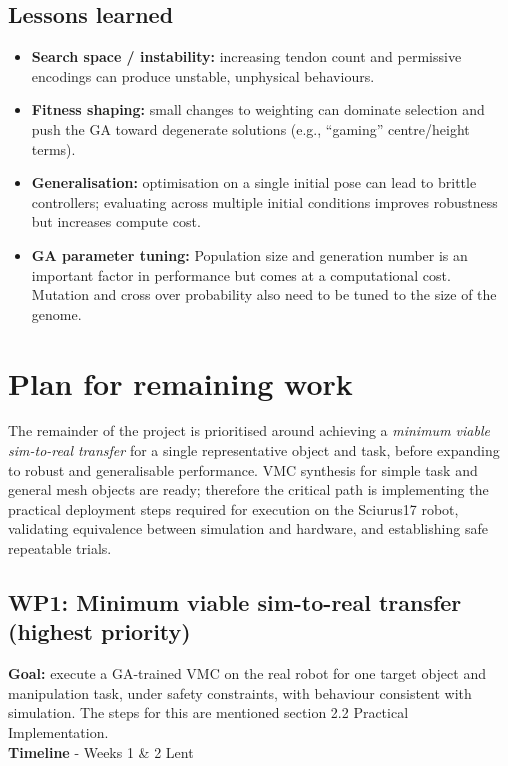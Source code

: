 \documentclass[12pt,a4paper,twocolumn]{article}
\begin{document}

\subsection{Lessons learned}
\begin{itemize}
    \item \textbf{Search space / instability:} increasing tendon count and permissive encodings can produce unstable, unphysical behaviours.
    \item \textbf{Fitness shaping:} small changes to weighting can dominate selection and push the GA toward degenerate solutions (e.g., ``gaming'' centre/height terms).
    \item \textbf{Generalisation:} optimisation on a single initial pose can lead to brittle controllers; evaluating across multiple initial conditions improves robustness but increases compute cost.
    \item \textbf{GA parameter tuning:} Population size and generation number is an important factor in performance but comes at a computational cost. Mutation and cross over probability also need to be tuned to the size of the genome.
\end{itemize}

\section{Plan for remaining work}

The remainder of the project is prioritised around achieving a \emph{minimum viable sim-to-real transfer} for a single representative object and task, before expanding to robust and generalisable performance. VMC synthesis for simple task and general mesh objects are ready; therefore the critical path is implementing the practical deployment steps required for execution on the Sciurus17 robot, validating equivalence between simulation and hardware, and establishing safe repeatable trials.

\subsection{WP1: Minimum viable sim-to-real transfer (highest priority)}
\textbf{Goal:} execute a GA-trained VMC on the real robot for one target object and manipulation task, under safety constraints, with behaviour consistent with simulation. The steps for this are mentioned section 2.2 Practical Implementation. \\
\textbf{Timeline} - Weeks 1 \& 2 Lent
\end{document}

